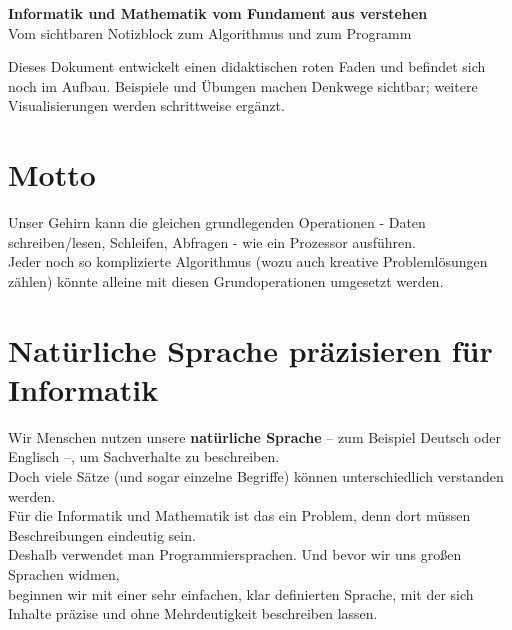 \documentclass{article}
\begin{document}
\begin{center}
  {\huge\bfseries\color{hauptfarbe} Informatik und Mathematik vom Fundament aus verstehen}\\[0.6em]
  {\large Vom sichtbaren Notizblock zum Algorithmus und zum Programm}
\end{center}

\begin{merksatz}[Arbeitsstand]
Dieses Dokument entwickelt einen didaktischen roten Faden und befindet sich noch im Aufbau. Beispiele und Übungen machen Denkwege sichtbar; weitere Visualisierungen werden schrittweise ergänzt.
\end{merksatz}

	\tableofcontents
\newpage


        \section{Motto}

        Unser Gehirn kann die gleichen grundlegenden Operationen - Daten schreiben/lesen, Schleifen, Abfragen - wie ein Prozessor ausführen.\\
        Jeder noch so komplizierte Algorithmus (wozu auch kreative Problemlösungen zählen) könnte alleine mit diesen Grundoperationen umgesetzt werden.
      
        \section{Natürliche Sprache präzisieren für Informatik}

          Wir Menschen nutzen unsere \textbf{natürliche Sprache} – zum Beispiel Deutsch oder Englisch –, um Sachverhalte zu beschreiben.\\
          Doch viele Sätze (und sogar einzelne Begriffe) können unterschiedlich verstanden werden.\\
          Für die Informatik und Mathematik ist das ein Problem, denn dort müssen Beschreibungen eindeutig sein.\\
          Deshalb verwendet man Programmiersprachen. Und bevor wir uns großen Sprachen widmen,\\
          beginnen wir mit einer sehr einfachen, klar definierten Sprache, mit der sich Inhalte präzise und ohne Mehrdeutigkeit beschreiben lassen.
        


      
    
\end{document}
